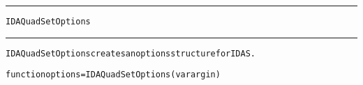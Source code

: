 \begin{samepage}
\hrule
\begin{center}
{\large \verb!IDAQuadSetOptions!}
\label{p:IDAQuadSetOptions}
\end{center}
\hrule\vspace{0.1in}



\begin{alltt}
IDAQuadSetOptions creates an options structure for IDAS.
\end{alltt}

\end{samepage}



\begin{samepage}


\begin{alltt}
function options = IDAQuadSetOptions(varargin) 
\end{alltt}

\end{samepage}



